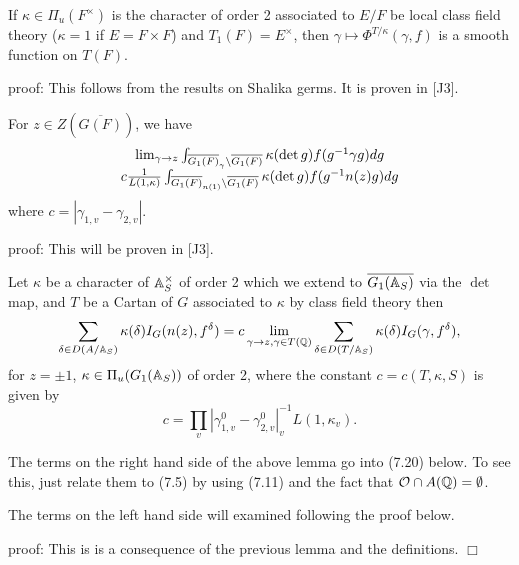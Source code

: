 \begin{lemma} If $\kappa\in \Pi_u(F^\times)$ is the character
of order 2
associated to $E/F$ be local class field theory ($\kappa =1$
if $E=F\times F$) and $T_1(F)=E^\times$, then
$\gamma\longmapsto \Phi^{T/\kappa}(\gamma,f)$ is a smooth function on
$T(F)$.
\end{lemma}

proof: This follows from the results on Shalika germs. It is proven
in [J3].

\begin{lemma} For $z\in Z(\overline{G(F)})$, we have
\[
\begin{array}{c}
\lim_{\gamma\rightarrow z}
\int_{\overline{G_1(F)}_\gamma\backslash \overline{G_1(F)}}
\kappa(\det{g})f(g^{-1}\gamma g)dg\\
c{1\over L(1,\kappa)}
\int_{\overline{G_1(F)}_{n(1)}\backslash \overline{G_1(F)}}
\kappa(\det{g})f(g^{-1}n(z) g)dg
\end{array}
\]
where $c=|\gamma_{1,v}-\gamma_{2,v}|$.
\end{lemma} 

proof: This will be proven in [J3].

\begin{lemma} Let $\kappa$ be a character of
$\mathbb{A} _S^\times $ of order 2 which we extend to
$\overline{G_1(\mathbb{A} _S)}$ via the $\det$ map,
and $T$ be a Cartan of $G$ associated to $\kappa$ by class field
theory then
\begin{equation}
\sum_{\delta\in D(A/\mathbb{A} _S)}
\kappa(\delta)I_G(n(z),f^\delta)
=c
\lim_{ \gamma\rightarrow z , \gamma\in T(\mathbb{Q} )}
\sum_{\delta\in D(T/\mathbb{A} _S)}
\kappa(\delta)I_G (\gamma, f^\delta),
\end{equation}
for $z =\pm 1$, $\kappa \in \Pi _u(G_1(\mathbb{A} _S))$ of order 2,
where the constant $c=c(T,\kappa,S)$ is given by
\[
c=\prod_v |\gamma_{1,v}^0-\gamma_{2,v}^0|_v^{-1}L(1,\kappa_v) .
\]
\end{lemma}

\begin{remark} The terms on the right hand side of the above
lemma go into (7.20) below. To see this, just relate them to
(7.5) by using (7.11) and the fact that
${\cal{O}}\cap A(\mathbb{Q} ) =\emptyset$.

The terms on the left hand side will examined following the proof
below.
\end{remark}

proof: This is is a consequence of the previous lemma and the
definitions. $\Box$

